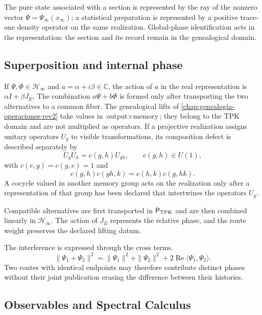 \begin{principle}
The pure state associated with a section is represented by the ray of the
nonzero vector \(\Psi=\Psi_\infty(x_\infty)\); a statistical preparation is
represented by a positive trace-one density operator on the same
realization. Global-phase identification acts in the representation:
the section and its record remain in the genealogical domain.
\end{principle}

\subsection{Superposition and internal phase}

If \(\Psi,\Phi\in\mathcal H_\infty\) and
\(a=\alpha+i\beta\in\mathbb C\), the action of \(a\) in the real representation
is \(\alpha I+\beta J_E\). The combination \(a\Psi+b\Phi\) is formed only after
transporting the two alternatives to a common fiber. The genealogical lifts
of \cref{chap:genealogia-operaciones-rev2} take values in
\(\text{output}\times\text{memory}\); they belong to the TPK domain and are not
multiplied as operators. If a projective realization assigns unitary
operators \(U_g\) to visible transformations, its composition defect is
described separately by
\[
 U_gU_h=c(g,h)U_{gh},
 \qquad c(g,h)\in U(1),
\]
with \(c(e,g)=c(g,e)=1\) and
\[
 c(g,h)c(gh,k)=c(h,k)c(g,hk).
\]
A cocycle valued in another memory group acts on the realization only
after a representation of that group has been declared that intertwines the
operators \(U_g\).

\begin{principle}
Compatible alternatives are first transported in
\(\mathsf P_{\rm TPK}\) and are then combined linearly in
\(\mathcal H_\infty\). The action of \(J_E\) represents the relative phase, and
the route weight preserves the declared lifting datum.
\end{principle}

The interference is expressed through the cross terms.
\[
 \|\Psi_1+\Psi_2\|^2
 =\|\Psi_1\|^2+\|\Psi_2\|^2
  +2\operatorname{Re}\langle\Psi_1,\Psi_2\rangle.
\]
Two routes with identical endpoints may therefore contribute distinct phases
without their joint publication erasing the difference between their histories.

\subsection{Observables and Spectral Calculus}


